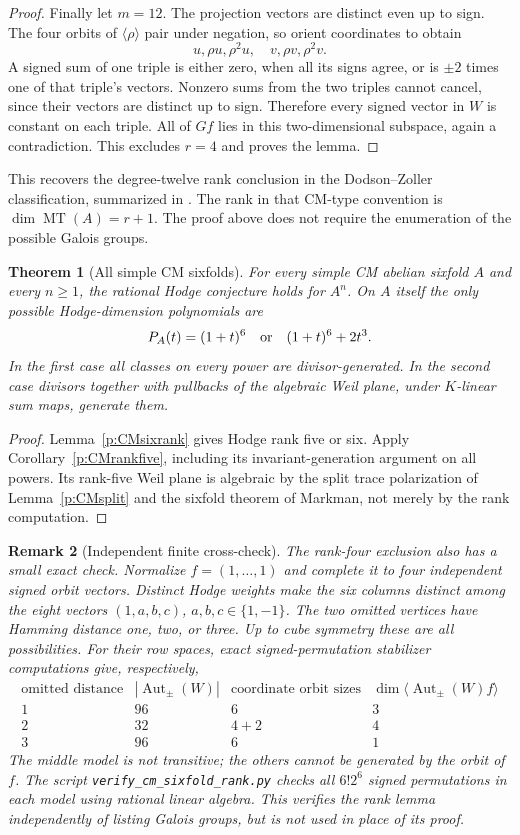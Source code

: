 \documentclass[10pt,reqno]{article}
\theoremstyle{emphasizedplain}
\newtheorem{theorem}{Theorem}[section]
\theoremstyle{emphasizeddefinition}
\theoremstyle{emphasizeddefinition}
\newtheorem{remark}[theorem]{Remark}
\DeclareMathOperator{\MT}{MT}
\begin{document}
\begin{proof}
Finally let $m=12$. The projection vectors are distinct even up to
sign. The four orbits of $\langle\rho\rangle$ pair under negation,
so orient coordinates to obtain
\[
 u,\rho u,\rho^2u,\quad v,\rho v,\rho^2v.
\]
A signed sum of one triple is either zero, when all its signs agree,
or is $\pm2$ times one of that triple's vectors. Nonzero sums from
the two triples cannot cancel, since their vectors are distinct up
to sign. Therefore every signed vector in $W$ is constant on each
triple. All of $Gf$ lies in this two-dimensional subspace, again a
contradiction. This excludes $r=4$ and proves the lemma.
\end{proof}
This recovers the degree-twelve rank conclusion in the Dodson--Zoller
classification, summarized in \cite[\S2.2.2]{Borselli}. The rank in
that CM-type convention is $\dim\MT(A)=r+1$. The proof above does
not require the enumeration of the possible Galois groups.

\begin{theorem}[All simple CM sixfolds]\label{p:CMcomplete}
For every simple CM abelian sixfold $A$ and every $n\ge1$, the
rational Hodge conjecture holds for $A^n$.
On $A$ itself the only possible Hodge-dimension polynomials are
\[
 P_A(t)=(1+t)^6\quad\hbox{or}\quad (1+t)^6+2t^3.
\]
In the first case all classes on every power are divisor-generated.
In the second case divisors together with pullbacks of the algebraic
Weil plane, under $K$-linear sum maps, generate them.
\end{theorem}
\begin{proof}
Lemma~\ref{p:CMsixrank} gives Hodge rank five or six. Apply
Corollary~\ref{p:CMrankfive}, including its invariant-generation
argument on all powers. Its rank-five Weil plane is algebraic by
the split trace polarization of Lemma~\ref{p:CMsplit} and the
sixfold theorem of Markman, not merely by the rank computation.
\end{proof}

\begin{remark}[Independent finite cross-check]
The rank-four exclusion also has a small exact check. Normalize
$f=(1,\ldots,1)$ and complete it to four independent signed orbit
vectors. Distinct Hodge weights make the six columns distinct among
the eight vectors $(1,a,b,c)$, $a,b,c\in\{1,-1\}$. The two omitted
vertices have Hamming distance one, two, or three. Up to cube
symmetry these are all possibilities. For their row spaces, exact
signed-permutation stabilizer computations give, respectively,
\[
\begin{array}{c|c|c|c}
\text{omitted distance}&|\operatorname{Aut}_{\pm}(W)|&
 \text{coordinate orbit sizes}&
 \dim\langle\operatorname{Aut}_{\pm}(W)f\rangle\\\hline
1&96&6&3\\
2&32&4+2&4\\
3&96&6&1
\end{array}
\]
The middle model is not transitive; the others cannot be generated
by the orbit of $f$. The script \texttt{verify\_cm\_sixfold\_rank.py}
checks all $6!2^6$ signed permutations in each model using rational
linear algebra. This verifies the rank lemma independently of
listing Galois groups, but is not used in place of its proof.
\end{remark}
\end{document}
